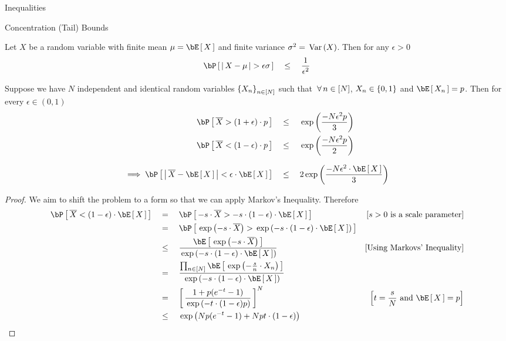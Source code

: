 \documentclass{article}
\begin{document}
\begin{ssection}{Inequalities}
\begin{ssubsection}{Concentration (Tail) Bounds}
\begin{enumerate}[label=\bt{\theenumi.}]
				Let $X$ be a random variable with finite mean $\mu = \E{X}$ and finite variance $\sigma^2 = \var{X}$. Then for any $\epsilon > 0$
				\begin{align*}
					\prob{\abs{X - \mu} > \epsilon \sigma}	\qle	\frac{1}{\epsilon^2}
				\end{align*}


				Suppose we have $N$ independent and identical random variables $\left\{ {X_n} \right\}_{n \in [N]}$ such that $\,\forall\, n \in [N]$, $X_n \in \left\{ {0, 1} \right\}$ and $\E{X_n} = p$. Then for every $\epsilon \in (0, 1)$
				\begin{align*}
					\prob{\compl{X} > (1 + \epsilon) \cdot p}						&\qle	\texp{\frac{-N \epsilon^2 p}{3}} \\
					\prob{\compl{X} < (1 - \epsilon) \cdot p}						&\qle	\texp{\frac{-N \epsilon^2 p}{2}} \\[0.7em]
					\implies
					\prob{\abs{\compl{X} - \E{X}} < \epsilon \cdot \E{X}}	&\qle	2 \texp{\frac{-N \epsilon^2 \cdot \E{X}}{3}}
				\end{align*}

				\begin{proof} We aim to shift the problem to a form so that we can apply Markov's Inequality. Therefore
                    \begingroup{}
					\addtolength{\jot}{4pt}
					\begin{align*}
						\prob{\compl{X} < (1 - \epsilon) \cdot \E{X}}	&\eq	\prob{-s \cdot \compl{X} > -s \cdot (1 - \epsilon) \cdot \E{X}} \mcmnt{$s > 0$ is a scale parameter} \\
																		&\eq	\prob{\texp{-s \cdot \compl{X}} > \texp{-s \cdot (1 - \epsilon) \cdot \E{X}}} \\
																		&\qle	\frac{\E{\texp{-s \cdot \compl{X}}}}{\texp{-s \cdot (1 - \epsilon) \cdot \E{X}}} \mcmnt{Using Markovs' Inequality} \\
																		&\eq	\frac{\prod_{n \in [N]} \E{\texp{- \frac{s}{n} \cdot X_n}}}{\texp{-s \cdot (1 - \epsilon) \cdot \E{X}}} \\
																		&\eq	\brac{\frac{1 + p (\exp{-t} - 1)}{\texp{-t \cdot (1 - \epsilon) p}}}^N \mcmnt{$t = \frac{s}{N}$ and $\E{X} = p$} \\
																		&\qle	\texp{N p (\exp{-t} - 1) + N p t \cdot (1 - \epsilon)}
					\end{align*}


\end{proof}
\end{enumerate}
\end{ssubsection}
\end{ssection}
\end{document}
